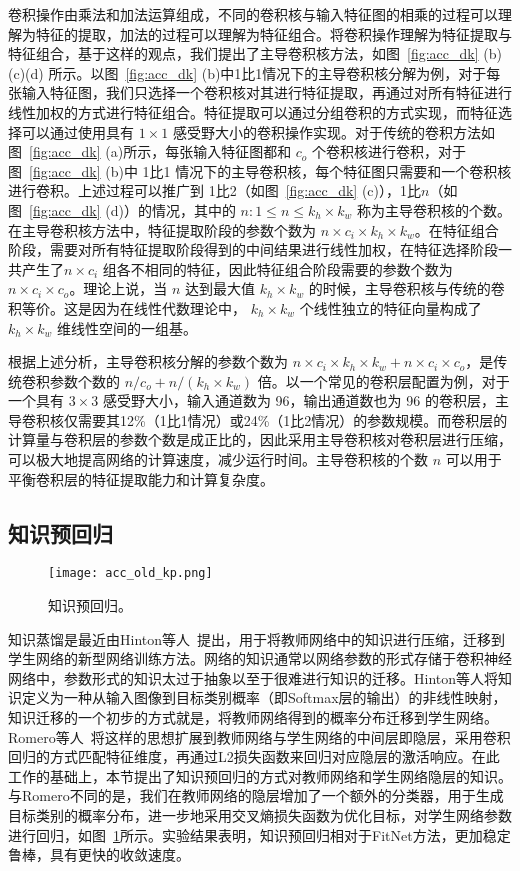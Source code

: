 卷积操作由乘法和加法运算组成，不同的卷积核与输入特征图的相乘的过程可以理解为特征的提取，加法的过程可以理解为特征组合。将卷积操作理解为特征提取与特征组合，基于这样的观点，我们提出了主导卷积核方法，如图~\ref{fig:acc_dk} (b)(c)(d) 所示。以图~\ref{fig:acc_dk} (b)中1比1情况下的主导卷积核分解为例，对于每张输入特征图，我们只选择一个卷积核对其进行特征提取，再通过对所有特征进行线性加权的方式进行特征组合。特征提取可以通过分组卷积的方式实现，而特征选择可以通过使用具有 $1\times1$ 感受野大小的卷积操作实现。对于传统的卷积方法如图~\ref{fig:acc_dk} (a)所示，每张输入特征图都和 $c_o$ 个卷积核进行卷积，对于图~\ref{fig:acc_dk} (b)中 1比1 情况下的主导卷积核，每个特征图只需要和一个卷积核进行卷积。上述过程可以推广到 1比2（如图~\ref{fig:acc_dk} (c)），1比$n$（如图~\ref{fig:acc_dk} (d)）的情况，其中的 $n: 1{\le}n{\le}k_h{\times}k_w$ 称为主导卷积核的个数。在主导卷积核方法中，特征提取阶段的参数个数为 $n{\times}c_i{\times}k_h{\times}k_w$。在特征组合阶段，需要对所有特征提取阶段得到的中间结果进行线性加权，在特征选择阶段一共产生了$n{\times}c_i$ 组各不相同的特征，因此特征组合阶段需要的参数个数为 $n{\times}c_i{\times}c_o$。理论上说，当 $n$ 达到最大值 $k_h{\times}k_w$ 的时候，主导卷积核与传统的卷积等价。这是因为在线性代数理论中， $k_h{\times}k_w$ 个线性独立的特征向量构成了 $k_h{\times}k_w$ 维线性空间的一组基。

根据上述分析，主导卷积核分解的参数个数为  $n{\times}c_i{\times}k_h{\times}k_w+n{\times}c_i{\times}c_o$，是传统卷积参数个数的 $n/c_o+n/(k_h{\times}k_w)$ 倍。以一个常见的卷积层配置为例，对于一个具有 $3{\times}3$ 感受野大小，输入通道数为 96，输出通道数也为 96 的卷积层，主导卷积核仅需要其12\%（1比1情况）或24\%（1比2情况）的参数规模。而卷积层的计算量与卷积层的参数个数是成正比的，因此采用主导卷积核对卷积层进行压缩，可以极大地提高网络的计算速度，减少运行时间。主导卷积核的个数 $n$ 可以用于平衡卷积层的特征提取能力和计算复杂度。

\subsection{知识预回归}
\label{sec:acc:model:kp}

\begin{figure}[t]
\centering
\centerline{\texttt{[image: acc\_old\_kp.png]}}
\caption{知识预回归。}
\label{fig:acc_kp}
\end{figure} 

知识蒸馏是最近由Hinton等人~\cite{hinton2015distilling}提出，用于将教师网络中的知识进行压缩，迁移到学生网络的新型网络训练方法。网络的知识通常以网络参数的形式存储于卷积神经网络中，参数形式的知识太过于抽象以至于很难进行知识的迁移。Hinton等人将知识定义为一种从输入图像到目标类别概率（即Softmax层的输出）的非线性映射，知识迁移的一个初步的方式就是，将教师网络得到的概率分布迁移到学生网络。Romero等人~\cite{romero2014fitnets}将这样的思想扩展到教师网络与学生网络的中间层即隐层，采用卷积回归的方式匹配特征维度，再通过L2损失函数来回归对应隐层的激活响应。在此工作的基础上，本节提出了知识预回归的方式对教师网络和学生网络隐层的知识。与Romero不同的是，我们在教师网络的隐层增加了一个额外的分类器，用于生成目标类别的概率分布，进一步地采用交叉熵损失函数为优化目标，对学生网络参数进行回归，如图~\ref{fig:acc_kp}所示。实验结果表明，知识预回归相对于FitNet方法，更加稳定鲁棒，具有更快的收敛速度。

